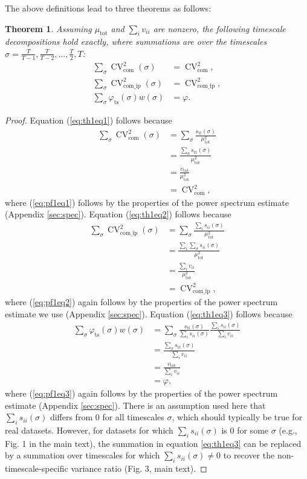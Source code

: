 \documentclass[letterpaper,11pt]{article}
\newcommand{\CV}{{\operatorname{CV}}}
\newcommand{\com}{{\operatorname{com}}}
\newcommand{\comip}{{\operatorname{com\_ip}}}
\newcommand{\ts}{{\operatorname{ts}}}
\newtheorem{theorem}{Theorem}[]
\begin{document}
The above definitions lead to three theorems as follows:
\begin{theorem}\label{thm:freqdecom}
Assuming $\mu_{\text{tot}}$ and $\sum_i v_{ii}$ are nonzero, the following timescale decompositions hold exactly, where summations are over the
timescales $\sigma=\frac{T}{T-1},\frac{T}{T-2},\ldots,\frac{T}{2},T$:
\begin{align}
\sum_{\sigma}\CV_{\com}^2(\sigma) &= \CV_{\com}^2, \label{eq:th1eq1}\\
\sum_{\sigma}\CV_{\comip}^2(\sigma) &= \CV_{\comip}^2, \label{eq:th1eq2}\\
\sum_{\sigma}\varphi_{\ts}(\sigma) w(\sigma) &= \varphi. \label{eq:th1eq3}
\end{align}
\end{theorem}
\begin{proof}
Equation (\ref{eq:th1eq1}) follows because
\begin{align}
\sum_{\sigma}\CV_{\com}^2(\sigma) &= \sum_{\sigma} \frac{s_{\text{tt}}(\sigma)}{\mu_{\text{tot}}^2} \\
&= \frac{\sum_{\sigma}  s_{\text{tt}}(\sigma)}{\mu_{\text{tot}}^2} \\
&= \frac{v_{\text{tot}}}{\mu_{\text{tot}}^2} \label{eq:pf1eq1}\\
&= \CV_{\com}^2,
\end{align}
where (\ref{eq:pf1eq1}) follows by the properties of the power spectrum 
estimate (Appendix
\ref{sec:spec}). Equation (\ref{eq:th1eq2}) follows because
\begin{align}
\sum_{\sigma}\CV_{\comip}^2(\sigma) &= \sum_{\sigma} \frac{\sum_i s_{ii}(\sigma)}{\mu_{\text{tot}}^2} \\
&= \frac{\sum_i \sum_\sigma s_{ii}(\sigma)}{\mu_{\text{tot}}^2} \\
&= \frac{\sum_i v_{ii}}{\mu_{\text{tot}}^2} \label{eq:pf1eq2}\\
&= \CV_{\comip}^2,
\end{align}
where (\ref{eq:pf1eq2}) again follows by the properties of the power spectrum
estimate we use (Appendix \ref{sec:spec}). Equation (\ref{eq:th1eq3}) follows because
\begin{align}
\sum_{\sigma}\varphi_{\ts}(\sigma) w(\sigma) &= \sum_{\sigma} \frac{s_{\text{tt}}(\sigma)}{\sum_i s_{ii}(\sigma)}
 \frac{\sum_i s_{ii}(\sigma)}{\sum_i v_{ii}} \\
&= \frac{\sum_{\sigma} s_{\text{tt}}(\sigma)}{\sum_i v_{ii}} \\
&= \frac{v_{\text{tot}}}{\sum_i v_{ii}} \label{eq:pf1eq3}\\
&= \varphi, 
\end{align}
where (\ref{eq:pf1eq3}) again follows by the properties of the power spectrum
estimate (Appendix \ref{sec:spec}). There is an assumption used here that 
$\sum_i s_{ii}(\sigma)$ differs from $0$ for all timescales 
$\sigma$, which should typically be true for real datasets. However, for
datasets for which $\sum_i s_{ii}(\sigma)$ is $0$ for some $\sigma$ (e.g., Fig. 1 in 
the main text),
the summation in equation \ref{eq:th1eq3} can be replaced by a summation
over timescales for which $\sum_i s_{ii}(\sigma) \neq 0$ to recover the
non-timescale-specific variance ratio (Fig. 3, main text).
\end{proof}
\end{document}
